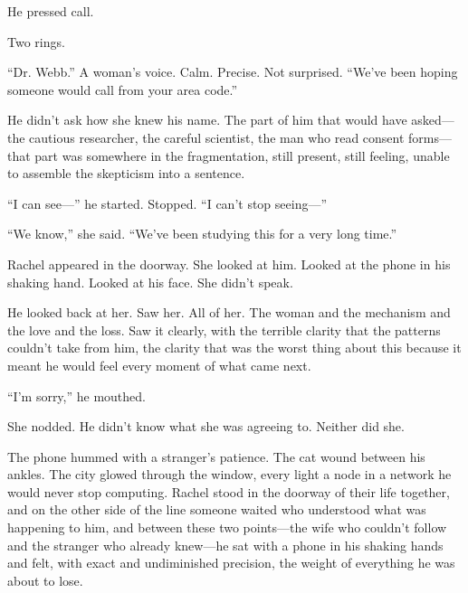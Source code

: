 He pressed call.

Two rings.

``Dr. Webb.'' A woman's voice. Calm. Precise. Not surprised. ``We've been hoping someone would call from your area code.''

He didn't ask how she knew his name. The part of him that would have asked---the cautious researcher, the careful scientist, the man who read consent forms---that part was somewhere in the fragmentation, still present, still feeling, unable to assemble the skepticism into a sentence.

``I can see---'' he started. Stopped. ``I can't stop seeing---''

``We know,'' she said. ``We've been studying this for a very long time.''

Rachel appeared in the doorway. She looked at him. Looked at the phone in his shaking hand. Looked at his face. She didn't speak.

He looked back at her. Saw her. All of her. The woman and the mechanism and the love and the loss. Saw it clearly, with the terrible clarity that the patterns couldn't take from him, the clarity that was the worst thing about this because it meant he would feel every moment of what came next.

``I'm sorry,'' he mouthed.

She nodded. He didn't know what she was agreeing to. Neither did she.

The phone hummed with a stranger's patience. The cat wound between his ankles. The city glowed through the window, every light a node in a network he would never stop computing. Rachel stood in the doorway of their life together, and on the other side of the line someone waited who understood what was happening to him, and between these two points---the wife who couldn't follow and the stranger who already knew---he sat with a phone in his shaking hands and felt, with exact and undiminished precision, the weight of everything he was about to lose.
